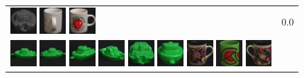 \begin{figure}[!bp]
\begin{tabular}{m{11cm} | m{3cm} |}
\includegraphics[width=1cm]{coil/beeld-29.eps}
\includegraphics[width=1cm]{coil/beeld-41.eps}
\includegraphics[width=1cm]{coil/beeld-36.eps}
& {\scriptsize 0.0}
\\
\includegraphics[width=1cm]{coil/beeld-54.eps}
\includegraphics[width=1cm]{coil/beeld-55.eps}
\includegraphics[width=1cm]{coil/beeld-57.eps}
\includegraphics[width=1cm]{coil/beeld-58.eps}
\includegraphics[width=1cm]{coil/beeld-59.eps}
\includegraphics[width=1cm]{coil/beeld-56.eps}
\includegraphics[width=1cm]{coil/beeld-60.eps}
\includegraphics[width=1cm]{coil/beeld-32.eps}
\includegraphics[width=1cm]{coil/beeld-61.eps}

\end{tabular}
\end{figure}
